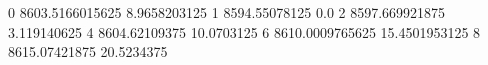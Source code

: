0 8603.5166015625 8.9658203125
1 8594.55078125 0.0
2 8597.669921875 3.119140625
4 8604.62109375 10.0703125
6 8610.0009765625 15.4501953125
8 8615.07421875 20.5234375
